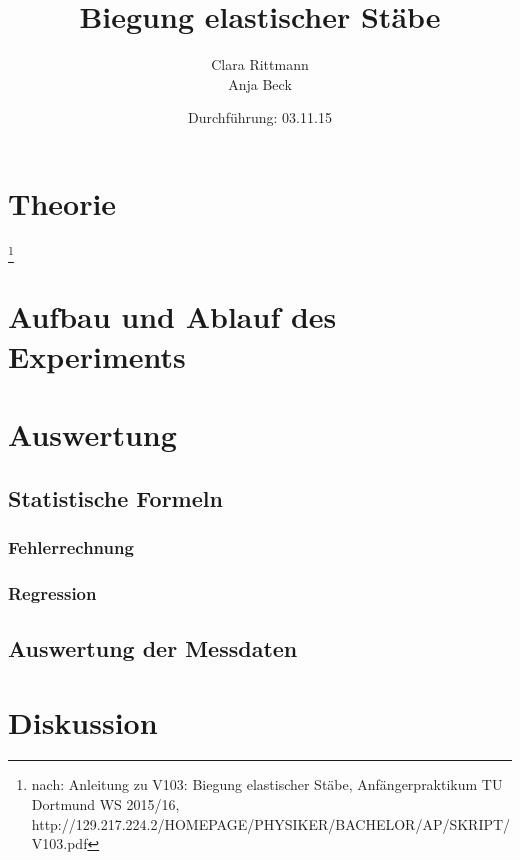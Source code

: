 \documentclass[a4,12pt]{article}
\title{Biegung elastischer Stäbe}
\author{Clara Rittmann \\ Anja Beck}
\date{Durchführung: 03.11.15}
\begin{document}
	\maketitle
	\date{}
\newpage
	\tableofcontents
\newpage

	\section{Theorie}\footnote{nach: Anleitung zu V103: Biegung elastischer Stäbe, Anfängerpraktikum TU Dortmund WS 2015/16, http://129.217.224.2/HOMEPAGE/PHYSIKER/BACHELOR/AP/SKRIPT/V103.pdf}
	
\newpage

	\section{Aufbau und Ablauf des Experiments}
	
\newpage

	\section{Auswertung}
	\subsection{Statistische Formeln}
	\subsubsection{Fehlerrechnung}
	
	\subsubsection{Regression}
	\label{sec:regression}
	
	\subsection{Auswertung der Messdaten}
	
\newpage

	\section{Diskussion}
	
\end{document}
